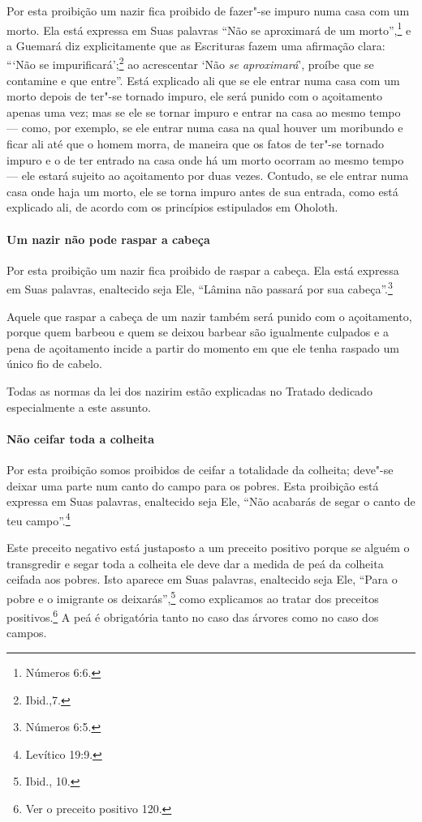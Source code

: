 \begin{multicols}{2}
Por esta proibição um nazir\starr{} fica proibido de fazer"-se impuro numa casa
com um morto. Ela está expressa em Suas palavras ``Não se aproximará de
um morto'',\footnote{Números 6:6.} e a Guemará\starr{} diz explicitamente que as
Escrituras fazem uma afirmação clara: ```Não se impurificará';\footnote{Ibid.,7.}
ao acrescentar `Não \emph{se aproximará}', proíbe que se
contamine e que entre''. Está explicado ali que se ele entrar numa casa
com um morto depois de ter"-se tornado impuro, ele será punido com o
açoitamento apenas uma vez; mas se ele se tornar impuro e entrar na casa
ao mesmo tempo --- como, por exemplo, se ele entrar numa casa na qual
houver um moribundo e ficar ali até que o homem morra, de maneira que
os fatos de ter"-se tornado impuro e o de ter entrado na casa onde há um
morto ocorram ao mesmo tempo --- ele estará sujeito ao açoitamento por
duas vezes. Contudo, se ele entrar numa casa onde haja um morto, ele se
torna impuro antes de sua entrada, como está explicado ali, de acordo
com os princípios estipulados em Oholoth.

\paragraph{Um nazir\starr{} não pode raspar a cabeça}

Por esta proibição um nazir\starr{} fica proibido de raspar a cabeça. Ela está
expressa em Suas palavras, enaltecido seja Ele, ``Lâmina não passará por
sua cabeça''.\footnote{Números 6:5.}

Aquele que raspar a cabeça de um nazir\starr{} também será punido com o
açoitamento, porque quem barbeou e quem se deixou barbear são
igualmente culpados e a pena de açoitamento incide a partir do momento
em que ele tenha raspado um único fio de cabelo.

Todas as normas da lei dos nazirim\starr{} estão explicadas no Tratado dedicado
especialmente a este assunto.

\paragraph{Não ceifar toda a colheita}

Por esta proibição somos proibidos de ceifar a totalidade da colheita;
deve"-se deixar uma parte num canto do campo para os pobres. Esta
proibição está expressa em Suas palavras, enaltecido seja Ele, ``Não
acabarás de segar o canto de teu campo''.\footnote{Levítico 19:9.}

Este preceito negativo está justaposto a um preceito positivo porque se
alguém o transgredir e segar toda a colheita ele deve dar a medida de
peá\starr{} da colheita ceifada aos pobres. Isto aparece em Suas palavras,
enaltecido seja Ele, ``Para o pobre e o imigrante os deixarás'',\footnote{Ibid.,
10.} como explicamos ao tratar dos preceitos
positivos.\footnote{Ver o preceito positivo 120.} A peá\starr{} é obrigatória tanto no caso
das árvores como no caso dos campos.


\end{multicols}
